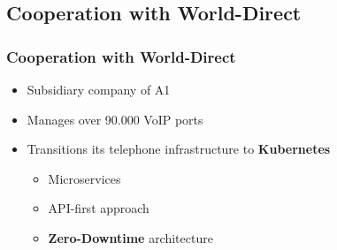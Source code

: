\documentclass[11pt,t,usepdftitle=false,aspectratio=169]{beamer}
\begin{document}
\subsection{Cooperation with World-Direct}
\begin{frame}
	\frametitle{Cooperation with {\color{uibkblue} World-Direct}}
	
	
	\begin{itemize}
		\item Subsidiary company of A1
		\item Manages over 90.000 VoIP ports
		\item Transitions its telephone infrastructure to \textbf{\color{uibkorange} Kubernetes}
		\begin{itemize}
			\item Microservices
			\item API-first approach
			\item \textbf{{\color{uibkorange} Zero-Downtime}} architecture
		\end{itemize}
	\end{itemize}
\end{frame}
\end{document}
